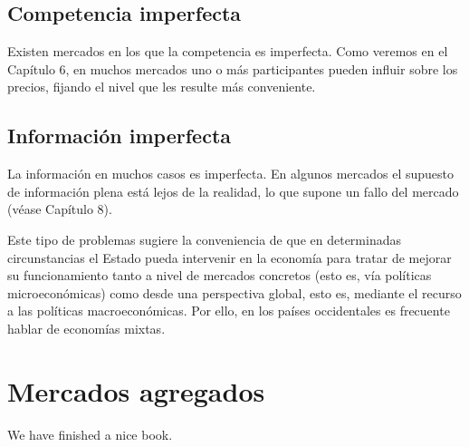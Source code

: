 \documentclass[
]{book}
\begin{document}
\hypertarget{competencia-imperfecta}{%
\section{Competencia imperfecta}\label{competencia-imperfecta}}

Existen mercados en los que la competencia es imperfecta. Como veremos en el Capítulo 6, en muchos mercados uno o más participantes pueden influir sobre los precios, fijando el nivel que les resulte más conveniente.

\hypertarget{informaciuxf3n-imperfecta}{%
\section{Información imperfecta}\label{informaciuxf3n-imperfecta}}

La información en muchos casos es imperfecta. En algunos mercados el supuesto de información plena está lejos de la realidad, lo que supone un fallo del mercado (véase Capítulo 8).

Este tipo de problemas sugiere la conveniencia de que en determinadas circunstancias el Estado pueda intervenir en la economía para tratar de mejorar su funcionamiento tanto a nivel de mercados concretos (esto es, vía políticas microeconómicas) como desde una perspectiva global, esto es, mediante el recurso a las políticas macroeconómicas. Por ello, en los países occidentales es frecuente hablar de economías mixtas.

\hypertarget{mercados-agregados}{%
\chapter{Mercados agregados}\label{mercados-agregados}}

We have finished a nice book.

  
\end{document}
